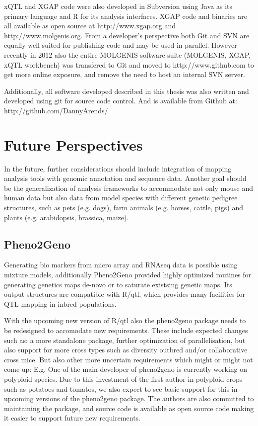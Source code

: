 xQTL and XGAP code were also developed in Subversion using Java as its primary language and 
R for its analysis interfaces. XGAP code and binaries are all available as open source at
http://www.xgap.org and http://www.molgenis.org. From a developer's perspective both Git and
SVN are equally well-suited for publishing code and may be used in parallel. However recently 
in 2012 also the entire MOLGENIS software suite (MOLGENIS, XGAP, xQTL workbench) was transfered 
to Git and moved to http://www.github.com to get more online exposure, and remove the need 
to host an internal SVN server.

Additionally, all software developed described in this thesis was also written and developed 
using git for source code control. And is available from Github at:
http://github.com/DannyArends/

\section*{Future Perspectives}
In the future, further considerations should include integration of mapping analysis tools 
with genomic annotation and sequence data. Another goal should be the generalization of 
analysis frameworks to accommodate not only mouse and human data but also data from model 
species with different genetic pedigree structures, such as pets (e.g. dogs), farm animals
(e.g. horses, cattle, pigs) and plants (e.g. arabidopsis, brassica, maize). 

\subsection*{Pheno2Geno}
Generating bio markers from micro array and RNAseq data is possible using mixture models, 
additionally Pheno2Geno provided highly optimized routines for generating genetics maps 
de-novo or to saturate existsing genetic maps. Its output structures are compatible with 
R/qtl, which provides many facilities for QTL mapping in inbred populations.

With the upcoming new version of R/qtl also the pheno2geno package needs to be redesigned 
to accomodate new requirements. These include expected changes such as: a more standalone package, 
further optimization of parallelisation, but also support for more cross types such as 
diversity outbred and/or collaborative cross mice. But also other more uncertain requirements 
which might or might not come up: E.g. One of the main developer of pheno2geno is currently working 
on polyploid species. Due to this investment of the first author in polyploid crops such as 
potatoes and tomatos, we also expect to see basic support for this in upcoming versions of 
the pheno2geno package. The authors are also committed to maintaining the package, and source 
code is available as open source code making it easier to support future new requirements.

